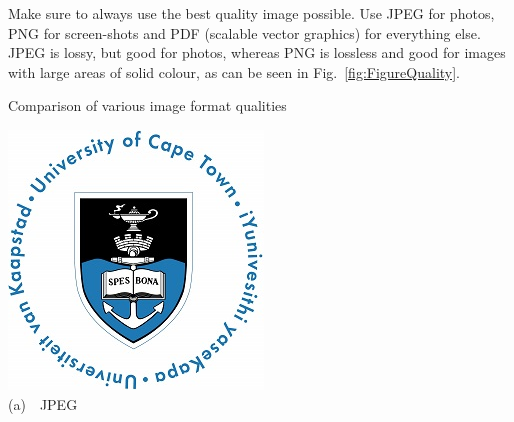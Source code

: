 
Make sure to always use the best quality image possible.  Use JPEG for photos, PNG for screen-shots and PDF (scalable vector graphics) for everything else.  JPEG is lossy, but good for photos, whereas PNG is lossless and good for images with large areas of solid colour, as can be seen in Fig.~\ref{fig:FigureQuality}.

\begin{FigureEnvironment}{Comparison of various image format qualities}%
  \label{fig:FigureQuality}%
  \hfill
  \begin{minipage}[b]{0.3\textwidth}\centering\setlength{\parindent}{0mm}
    \includegraphics[width=\textwidth]{../Figures/UCT.jpg}\\%
    {\small (a)~~JPEG}%
  \end{minipage}
  \hfill
  \begin{minipage}[b]{0.3\textwidth}\centering\setlength{\parindent}{0mm}

\end{minipage}
\end{FigureEnvironment}
